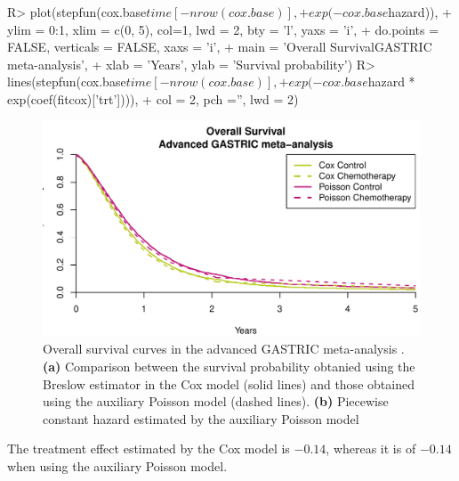 \documentclass[article,shortnames, nojss]{jss}\usepackage[]{graphicx}\usepackage[]{color}
\begin{document}
\begin{Schunk}
\begin{Sinput}
R>   plot(stepfun(cox.base$time[-nrow(cox.base)], 
+                exp(-cox.base$hazard)),
+        ylim = 0:1, xlim = c(0, 5), col=1, lwd = 2, bty = 'l', yaxs = 'i',
+        do.points = FALSE, verticals = FALSE, xaxs = 'i',
+        main = 'Overall Survival\nAdvanced GASTRIC meta-analysis',
+        xlab = 'Years', ylab = 'Survival probability')
R>   lines(stepfun(cox.base$time[-nrow(cox.base)],
+                exp(-cox.base$hazard * exp(coef(fitcox)['trt']))),
+        col = 2, pch ='', lwd = 2)
\end{Sinput}
\begin{figure}
\includegraphics[width=\textwidth]{figure/poissonize-1} \caption{Overall survival curves in the advanced GASTRIC meta-analysis \citep{GASTRIC13}. \textbf{(a)} Comparison between the survival probability obtanied using the Breslow estimator in the Cox model (solid lines) and those obtained using the auxiliary Poisson model (dashed lines). \textbf{(b)} Piecewise constant hazard estimated by the auxiliary Poisson model}\label{fig:poissonize}
\end{figure}
\end{Schunk}
The treatment effect estimated by the Cox model is
  \ensuremath{-0.14}, whereas it is of 
  \ensuremath{-0.14} when using the auxiliary Poisson model.
\end{document}

